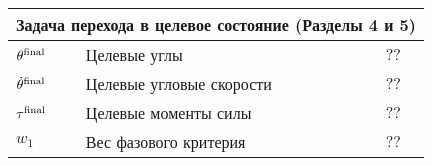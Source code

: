 \documentclass[../../doc.tex]{subfiles}
\begin{document}
    \begin{flushleft}\begin{tabular}{|p{2cm}|p{9cm}|p{4cm}|}
        \hline
        \multicolumn{3}{|c|}{Задача перехода в целевое состояние (Разделы 4 и 5)}
        \\ \hline
        $\theta^{\textnormal{final}}$ & Целевые углы & $??$
        \\ \hline
        $\dot \theta^{\textnormal{final}}$ & Целевые угловые скорости & $??$
        \\ \hline
        $\tau^{\textnormal{final}}$ & Целевые моменты силы & $??$
        \\ \hline
        $w_1$ & Вес фазового критерия & $??$
        \\ \hline
    \end{tabular}\end{flushleft}
    \clearpage
\end{document}
